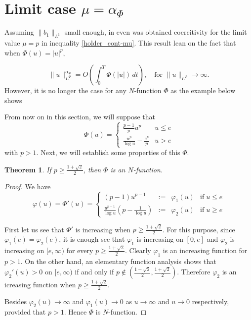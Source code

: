 \documentclass[twoside]{article}
\newtheorem{thm}{Theorem}[section]
\theoremstyle{remark}
\newcommand{\orlnor}{\|_{L^{\Phi}}}
\renewcommand{\leq}{\leqslant}
\renewcommand{\geq}{\geqslant}
\begin{document}
\section{Limit case $\mu=\alpha_{\Phi}$}
Assuming $\|b_1\|_{L^1}$  small enough, in  \cite{zhao2004periodic, tang2010periodic} even  was obtained coercitivity for the limit value $\mu=p$ in inequality \eqref{holder_cont-mu}.  This result lean on the  fact that when  $\Phi(u)=|u|^p$,

\begin{equation}
 \|u\orlnor^{\alpha_{\Phi}}=O\left(\int_0^T \Phi(|u|)\,dt\right),\quad\text{for } \|u\orlnor\to\infty.
\end{equation}
However, it is no longer the case  for any $N$-function $\Phi$ as the example below shows

From now on in this section, we will suppose that 
\[\Phi(u)=
\left\{
\begin{array}{ll}
\frac{p-1}{p}u^p&u\leq e
\\
\frac{u^p}{\log u}-\frac{e^p}{p}&u>e
\end{array}
\right.\]
with $p>1$. Next, we will establish some properties of this $\Phi$. 

\begin{thm}
If $p\geq \frac{1+\sqrt 2}{2}$, then $\Phi$ is an $N$-function.
\end{thm}


\begin{proof}
We have 
\[\varphi(u)=\Phi'(u)=\left\{
\begin{array}{cccc}
(p-1)u^{p-1}&:=&\varphi_1(u)& \mbox{if}\;u\leq e
\\
\frac{u^{p-1}}{\log u}(p-\frac{1}{\log u})&:=&\varphi_2(u)&\mbox{if}\; u\geq e
\end{array}
\right.
\]

First let us see that $\Phi'$ is increasing when $p\geq \frac{1+\sqrt {2}}{2}$.
For this purpose, since $\varphi_1(e)=\varphi_2(e)$, it is enough see that $\varphi_1$ is increasing  on $[0,e]$ and $\varphi_2$ is increasing on
$[e,\infty)$ for every $p\geq \frac{1+\sqrt {2}}{2}$. Clearly
$\varphi_1$ is an increasing function for $p>1$.  On the other hand, an elementary function analysis shows that
$\varphi_2'(u)>0$ on $[e,\infty)$ if and only if
 $p \notin(\frac{1-\sqrt2}{2},\frac{1+\sqrt2}{2})$.  Therefore $\varphi_2$ is an icreasing function when $p\geq \frac{1+\sqrt2}{2}$.

 Besides $\varphi_2(u)\to \infty$ and  $\varphi_1(u)\to 0$  as $u \to  \infty$ and $u\to 0$  respectively, provided that $p>1$. Hence $\Phi$ is $N$-function.

\end{proof}
\end{document}
